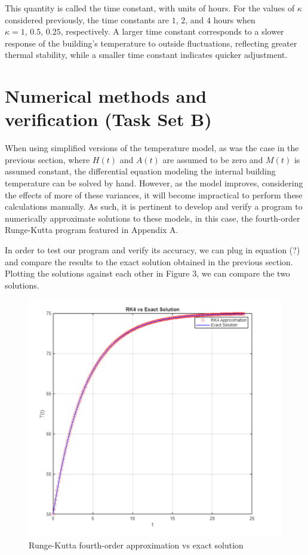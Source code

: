 \documentclass[12pt]{article}
\begin{document}
This quantity is called the time constant, with units of hours. For the values of $\kappa$ considered previously, the time constants are $1$, $2$, and $4$ hours when $\kappa = 1,\,0.5,\,0.25$, respectively. A larger time constant corresponds to a slower response of the building’s temperature to outside fluctuations, reflecting greater thermal stability, while a smaller time constant indicates quicker adjustment.


\section{Numerical methods and verification (Task Set B)}

When using simplified versions of the temperature model, as was the case in the previous section, where $H(t)$ and $A(t)$ are assumed to be zero and $M(t)$ is assumed constant, the differential equation modeling the internal building temperature can be solved by hand. However, as the model improves, considering the effects of more of these variances, it will become impractical to perform these calculations manually. As such, it is pertinent to develop and verify a program to numerically approximate solutions to these models, in this case, the fourth-order Runge-Kutta program featured in Appendix A.

In order to test our program and verify its accuracy, we can plug in equation (?) and compare the results to the exact solution obtained in the previous section. Plotting the solutions against each other in Figure 3, we can compare the two solutions.

\begin{figure}[H]
     \centering
    \includegraphics[width=0.75\linewidth]{images/Task_B1.png}
    \caption{Runge-Kutta fourth-order approximation vs exact solution}
    \label{fig:placeholder}
\end{figure}
   
\end{document}
